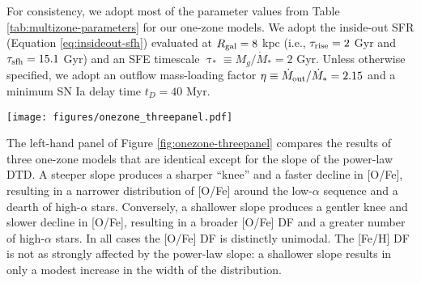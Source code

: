 \documentclass[twocolumn,twocolappendix,linenumbers,trackchanges]{aastex631}
\begin{document}
For consistency, we adopt most of the parameter values from Table \ref{tab:multizone-parameters} for our one-zone models.
We adopt the inside-out SFR (Equation \ref{eq:insideout-sfh}) evaluated at $R_{\rm gal}=8$ kpc (i.e., $\tau_{\rm rise}=2$ Gyr and $\tau_{\rm sfh}=15.1$ Gyr) and an SFE timescale $\uptau_*\equiv M_g/\dot M_*=2$ Gyr. Unless otherwise specified, we adopt an outflow mass-loading factor $\eta\equiv \dot M_{\rm out}/\dot M_*=2.15$  and a minimum SN Ia delay time $t_D=40$ Myr. 

\begin{figure*}
    \centering
    \texttt{[image: figures/onezone\_threepanel.pdf]}
    \caption{{\it Each panel:} Abundance tracks in the [Fe/H]--[O/Fe] plane for one-zone chemical evolution models which assume the same DTD. The open symbols along each curve mark logarithmic steps in time. The top and right-hand marginal panels present the distribution functions (DFs) of [Fe/H] and [O/Fe], respectively. For display purposes, these distributions are convolved with a Gaussian kernel with a standard deviation of 0.02 dex. 
    \textit{Left:} Three models which assume a power-law DTD with varying slope $\alpha$. 
    For reference, the solid gray curve represents an exponential DTD with $\tau=3$ Gyr. 
    \textit{Center:} Three models which assume an exponential DTD with varying timescale $\tau$. 
    \textit{Right:} Three models which assume a plateau DTD with varying plateau width $W$. 
    All assume a post-plateau slope of $\alpha=-1.1$. For reference, the solid gray curve represents an exponential DTD with $\tau=3$ Gyr, and the dotted purple curve represents a power-law DTD with $\alpha=-1.1$ and no plateau.}
    \label{fig:onezone-threepanel}
\end{figure*}

The left-hand panel of Figure \ref{fig:onezone-threepanel} compares the results of three one-zone models that are identical except for the slope of the power-law DTD. A steeper slope produces a sharper ``knee'' and a faster decline in [O/Fe], resulting in a narrower distribution of [O/Fe] around the low-$\alpha$ sequence and a dearth of high-$\alpha$ stars. Conversely, a shallower slope produces a gentler knee and slower decline in [O/Fe], resulting in a broader [O/Fe] DF and a greater number of high-$\alpha$ stars. In all cases the [O/Fe] DF is distinctly unimodal. The [Fe/H] DF is not as strongly affected by the power-law slope: a shallower slope results in only a modest increase in the width of the distribution.
\end{document}
